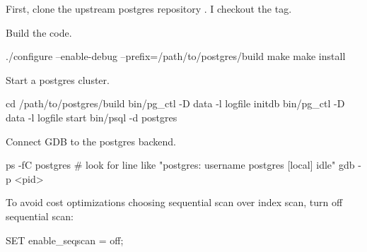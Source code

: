 First, clone the upstream postgres repository
.  I checkout the
 tag.

Build the code.

\begin{bashcode}
./configure --enable-debug --prefix=/path/to/postgres/build
make
make install
\end{bashcode}

Start a postgres cluster.

\begin{bashcode}
cd /path/to/postgres/build
bin/pg_ctl -D data -l logfile initdb
bin/pg_ctl -D data -l logfile start
bin/psql -d postgres
\end{bashcode}

Connect GDB to the postgres backend.

\begin{bashcode}
ps -fC postgres # look for line like "postgres: username postgres [local] idle"
gdb -p <pid>
\end{bashcode}

To avoid cost optimizations choosing sequential scan over index scan, turn off
sequential scan:

\begin{sqlcode}
SET enable_seqscan = off;
\end{sqlcode}
